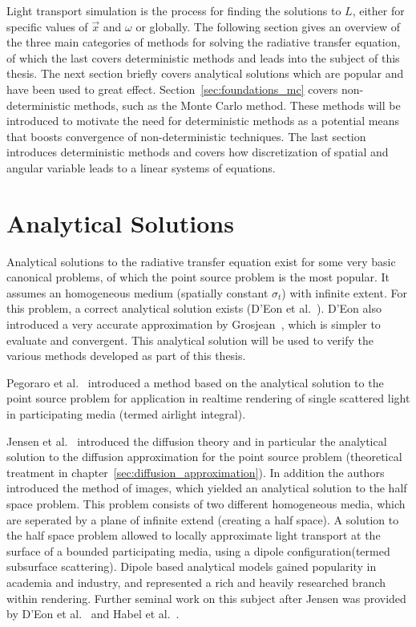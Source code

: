Light transport simulation is the process for finding the solutions to $L$, either for specific values of $\vec{x}$ and $\omega$ or globally. The following section gives an overview of the three main categories of methods for solving the radiative transfer equation, of which the last covers deterministic methods and leads into the subject of this thesis. The next section briefly covers analytical solutions which are popular and have been used to great effect. Section~\ref{sec:foundations_mc} covers non-deterministic methods, such as the Monte Carlo method. These methods will be introduced to motivate the need for deterministic methods as a potential means that boosts convergence of non-deterministic techniques. The last section introduces deterministic methods and covers how discretization of spatial and angular variable leads to a linear systems of equations.

\section{Analytical Solutions}
\label{sec:foundations_analytical}

Analytical solutions to the radiative transfer equation exist for some very basic canonical problems, of which the point source problem is the most popular. It assumes an homogeneous medium (spatially constant $\sigma_t$) with infinite extent. For this problem, a correct analytical solution exists (D'Eon et al.~\cite{dEon11}). D'Eon also introduced a very accurate approximation by Grosjean~\cite{Grosjean56}, which is simpler to evaluate and convergent. This analytical solution will be used to verify the various methods developed as part of this thesis.

Pegoraro et al.~\cite{Pegoraro11} introduced a method based on the analytical solution to the point source problem for application in realtime rendering of single scattered light in participating media (termed airlight integral).

Jensen et al.~\cite{Jensen01} introduced the diffusion theory and in particular the analytical solution to the diffusion approximation for the point source problem (theoretical treatment in chapter~\ref{sec:diffusion_approximation}). In addition the authors introduced the method of images, which yielded an analytical solution to the half space problem. This problem consists of two different homogeneous media, which are seperated by a plane of infinite extend (creating a half space). A solution to the half space problem allowed to locally approximate light transport at the surface of a bounded participating media, using a dipole configuration(termed subsurface scattering). Dipole based analytical models gained popularity in academia and industry, and represented a rich and heavily researched branch within rendering. Further seminal work on this subject after Jensen was provided by D'Eon et al.~\cite{dEon11} and Habel et al.~\cite{Habel13}.

